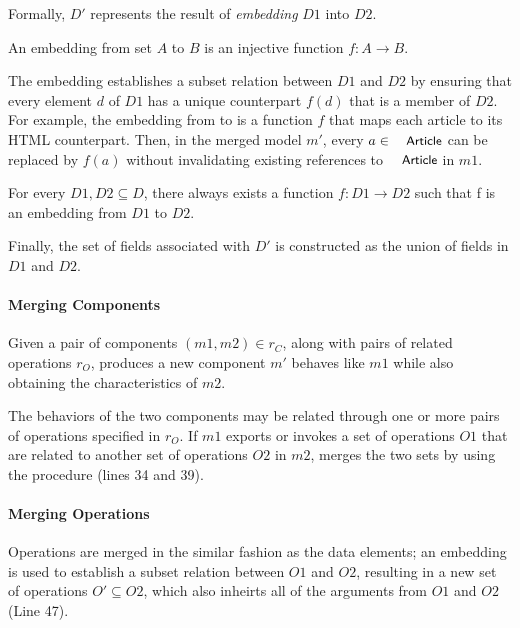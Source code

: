 Formally, $D'$ represents the result of \textit{embedding} $D1$ into
$D2$.
\begin{defn} An embedding from set $A$ to $B$ is an injective function
  $f : A \rightarrow B$.
\end{defn}
The embedding establishes a subset relation between $D1$ and $D2$ by
ensuring that every element $d$ of $D1$ has a unique counterpart
$f(d)$ that is a member of $D2$. For example, the embedding from
 to  is a function $f$ that maps each
article to its HTML counterpart. Then, in the merged model $m'$, every
$a \in \txtcname{Article}$ can be replaced by $f(a)$ without
invalidating existing references to $\txtcname{Article}$ in $m1$.

\begin{thm} For every $D1, D2 \subseteq D$, there always exists a
  function $f : D1 \rightarrow D2$ such that f is an embedding from
  $D1$ to $D2$.
\end{thm}

Finally, the set of fields associated with $D'$ is constructed as the
union of fields in $D1$ and $D2$. 

\paragraph{\textbf{Merging Components}} Given a pair of components $(m1, m2)
\in r_{C}$, along with pairs of related operations $r_{O}$,
 produces a new component $m'$ behaves like $m1$
while also obtaining the characteristics of $m2$.

The behaviors of the two components may be related through one or more
pairs of operations specified in $r_{O}$. If $m1$ exports or invokes
a set of operations $O1$ that are related to another set of operations
$O2$ in $m2$,  merges the two sets by using the
procedure  (lines 34 and 39). 

\paragraph{\textbf{Merging Operations}} Operations are merged in the
similar fashion as the data elements; an embedding is used to
establish a subset relation between $O1$ and $O2$, resulting in a new
set of operations $O' \subseteq O2$, which also inheirts all of the
arguments from $O1$ and $O2$ (Line 47).

